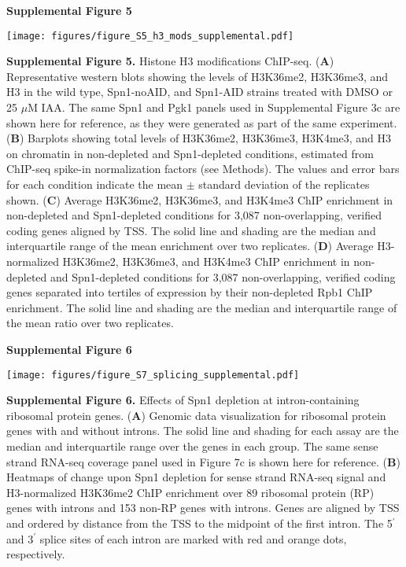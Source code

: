 \documentclass[8pt]{extarticle}
\begin{document}
\newpage

\textbf{\large Supplemental Figure 5}

{\texttt{[image: figures/figure\_S5\_h3\_mods\_supplemental.pdf]}\par}

\vspace{2em}
\textbf{Supplemental Figure 5.} Histone H3 modifications ChIP-seq.
(\textbf{A}) Representative western blots showing the levels of H3K36me2, H3K36me3, and H3 in the wild type, Spn1-noAID, and Spn1-AID strains treated with DMSO or 25 $\mu$M IAA.
The same Spn1 and Pgk1 panels used in Supplemental Figure 3c are shown here for reference, as they were generated as part of the same experiment.
(\textbf{B}) Barplots showing total levels of H3K36me2, H3K36me3, H3K4me3, and H3 on chromatin in non-depleted and Spn1-depleted conditions, estimated from ChIP-seq spike-in normalization factors (see Methods).
The values and error bars for each condition indicate the mean $\pm$ standard deviation of the replicates shown.
(\textbf{C}) Average H3K36me2, H3K36me3, and H3K4me3 ChIP enrichment in non-depleted and Spn1-depleted conditions for 3,087 non-overlapping, verified coding genes aligned by TSS.
The solid line and shading are the median and interquartile range of the mean enrichment over two replicates.
(\textbf{D}) Average H3-normalized H3K36me2, H3K36me3, and H3K4me3 ChIP enrichment in non-depleted and Spn1-depleted conditions for 3,087 non-overlapping, verified coding genes separated into tertiles of expression by their non-depleted Rpb1 ChIP enrichment.
The solid line and shading are the median and interquartile range of the mean ratio over two replicates.

\newpage




\textbf{\large Supplemental Figure 6}

{\texttt{[image: figures/figure\_S7\_splicing\_supplemental.pdf]}\par}

\vspace{2em}
\textbf{Supplemental Figure 6.} Effects of Spn1 depletion at intron-containing ribosomal protein genes.
(\textbf{A}) Genomic data visualization for ribosomal protein genes with and without introns.
The solid line and shading for each assay are the median and interquartile range over the genes in each group.
The same sense strand RNA-seq coverage panel used in Figure 7c is shown here for reference.
(\textbf{B}) Heatmaps of change upon Spn1 depletion for sense strand RNA-seq signal and H3-normalized H3K36me2 ChIP enrichment over 89 ribosomal protein (RP) genes with introns and 153 non-RP genes with introns.
Genes are aligned by TSS and ordered by distance from the TSS to the midpoint of the first intron.
The 5$^\prime$ and 3$^\prime$ splice sites of each intron are marked with red and orange dots, respectively.

\newpage
\end{document}
